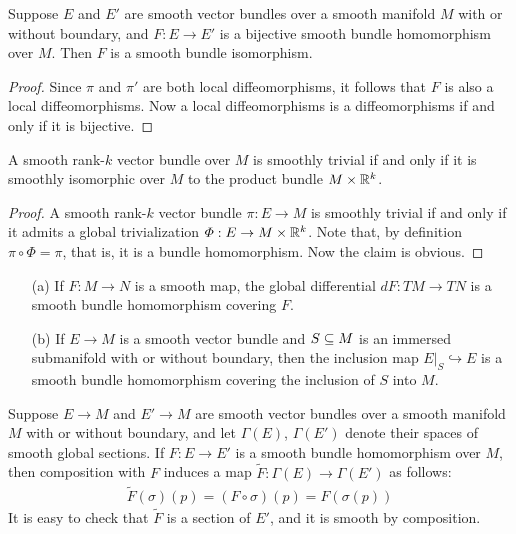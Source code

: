 \begin{proposition}\label{vector bundle smooth iso iff bi}
Suppose $E$ and $E'$ are smooth vector bundles over a smooth manifold $M$ with or without boundary, and $F:E\to E'$ is a bijective smooth bundle homomorphism over $M$. Then $F$ is a smooth bundle isomorphism.
\end{proposition}
\begin{proof}
Since $\pi$ and $\pi'$ are both local diffeomorphisms, it follows that $F$ is also a local diffeomorphisms. Now a local diffeomorphisms is a diffeomorphisms if and only if it is bijective.
\end{proof}
\begin{corollary}
A smooth rank-$k$ vector bundle over $M$ is smoothly trivial if and only if it is smoothly isomorphic over $M$ to the product bundle $M\times\mathbb{R}^k$.
\end{corollary}
\begin{proof}
A smooth rank-$k$ vector bundle $\pi:E\to M$ is smoothly trivial if and only if it admits a global trivialization $\varPhi:E\to M\times\mathbb{R}^k$. Note that, by definition $\pi\circ\varPhi=\pi$, that is, it is a bundle homomorphism. Now the claim is obvious.
\end{proof}
\begin{example}
\mbox{}
\begin{itemize}
\item[(a)]If $F:M\to N$ is a smooth map, the global differential $dF:TM\to TN$ is a smooth bundle homomorphism covering $F$.
\item[(b)]If $E\to M$ is a smooth vector bundle and $S\subseteq M$ is an immersed submanifold with or without boundary, then the inclusion map $E|_S\hookrightarrow E$ is a smooth bundle homomorphism covering the inclusion of $S$ into $M$.
\end{itemize}
\end{example}
Suppose $E\to M$ and $E'\to M$ are smooth vector bundles over a smooth manifold $M$ with or without boundary, and let $\Gamma(E)$, $\Gamma(E')$ denote their spaces of smooth global sections. If $F:E\to E'$ is a smooth bundle homomorphism over $M$, then composition with $F$ induces a map $\widetilde{F}:\Gamma(E)\to\Gamma(E')$ as follows:
\begin{align}\label{global section homomorphism-1}
\widetilde{F}(\sigma)(p)=(F\circ\sigma)(p)=F(\sigma(p))
\end{align}
It is easy to check that $\widetilde{F}$ is a section of $E'$, and it is smooth by composition.\par

